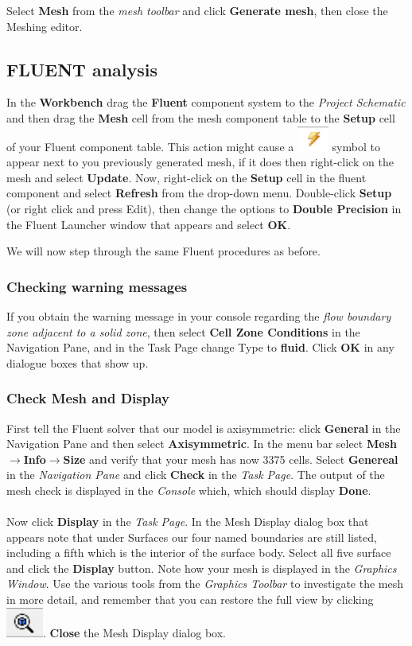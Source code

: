 \documentclass[11pt,a4paper,oneside]{scrartcl}
\newcommand\bfr[1]{\textcolor[rgb]{1,0.00,0.00}{\textbf{\textsf{#1}}}}
\begin{document}
Select \bfr{Mesh} from the \emph{mesh toolbar} and click \bfr{Generate mesh}, then close the Meshing editor.

\subsection{FLUENT analysis}


In the \bfr{Workbench} drag the \bfr{Fluent} component system to the \emph{Project Schematic} and then drag the \bfr{Mesh} cell from the mesh component table to the \bfr{Setup} cell of your Fluent component table. This action might cause a \includegraphics[width=.2cm]{lightning_symbol.png} symbol to appear next to you previously generated mesh, if it does then right-click on the mesh and select \bfr{Update}. Now, right-click on the \bfr{Setup} cell in the fluent component and select \bfr{Refresh} from the drop-down menu. Double-click \bfr{Setup} (or right click and press Edit), then change the options to \bfr{Double Precision} in the Fluent Launcher window that appears and select \bfr{OK}.

We will now step through the same Fluent procedures as before.

\subsubsection{Checking warning messages}

If you obtain the warning message in your console regarding the \emph{flow boundary zone adjacent to a solid zone}, then select \bfr{Cell Zone Conditions} in the Navigation Pane, and in the Task Page change Type to \bfr{fluid}. Click \bfr{OK} in any dialogue boxes that show up.

\subsubsection{Check Mesh and Display}
First tell the Fluent solver that our model is axisymmetric: click \bfr{General} in the Navigation Pane and then select \bfr{Axisymmetric}.
In the menu bar select \bfr{Mesh$\rightarrow$Info$\rightarrow$Size} and verify that your mesh has now 3375 cells.
Select \bfr{Genereal} in the \emph{Navigation Pane} and click \bfr{Check} in the \emph{Task Page}. The output of the mesh check is displayed in the \emph{Console} which, which should display \bfr{Done}.
\\
\\
Now click \bfr{Display} in the \emph{Task Page}. In the Mesh Display dialog box that appears note that under Surfaces our four named boundaries are still listed, including a fifth which is the interior of the surface body. Select all five surface and click the \bfr{Display} button. Note how your mesh is displayed in the \emph{Graphics Window}. Use the various tools from the \emph{Graphics Toolbar} to investigate the mesh in more detail, and remember that you can restore the full view by clicking \includegraphics[width=.5cm]{zoom_to_fit.png}. \bfr{Close} the Mesh Display dialog box.
\end{document}
